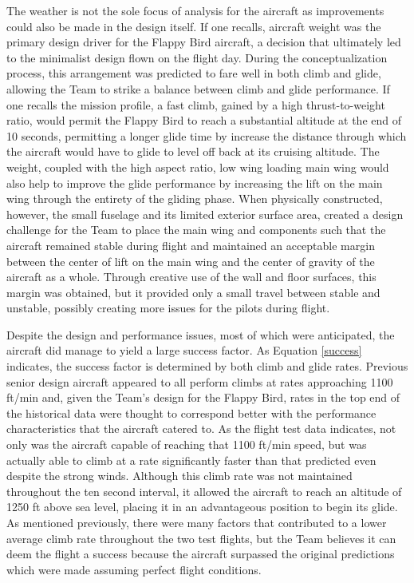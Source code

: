 \documentclass[titlepage]{article}
\begin{document}
The weather is not the sole focus of analysis for the aircraft as improvements could also be made in the design itself. If one recalls, aircraft weight was the primary design driver for the Flappy Bird aircraft, a decision that ultimately led to the minimalist design flown on the flight day. During the conceptualization process, this arrangement was predicted to fare well in both climb and glide, allowing the Team to strike a balance between climb and glide performance. If one recalls the mission profile, a fast climb, gained by a high thrust-to-weight ratio, would permit the Flappy Bird to reach a substantial altitude at the end of 10 seconds, permitting a longer glide time by increase the distance through which the aircraft would have to glide to level off back at its cruising altitude. The weight, coupled with the high aspect ratio, low wing loading main wing would also help to improve the glide performance by increasing the lift on the main wing through the entirety of the gliding phase. When physically constructed, however, the small fuselage and its limited exterior surface area, created a design challenge for the Team to place the main wing and components such that the aircraft remained stable during flight and maintained an acceptable margin between the center of lift on the main wing and the center of gravity of the aircraft as a whole. Through creative use of the wall and floor surfaces, this margin was obtained, but it provided only a small travel between stable and unstable, possibly creating more issues for the pilots during flight.

Despite the design and performance issues, most of which were anticipated, the aircraft did manage to yield a large success factor. As Equation \ref{success} indicates, the success factor is determined by both climb and glide rates. Previous senior design aircraft appeared to all perform climbs at rates approaching 1100 ft/min and, given the Team's design for the Flappy Bird, rates in the top end of the historical data were thought to correspond better with the performance characteristics that the aircraft catered to. As the flight test data indicates, not only was the aircraft capable of reaching that 1100 ft/min speed, but was actually able to climb at a rate significantly faster than that predicted even despite the strong winds. Although this climb rate was not maintained throughout the ten second interval, it allowed the aircraft to reach an altitude of 1250 ft above sea level, placing it in an advantageous position to begin its glide. As mentioned previously, there were many factors that contributed to a lower average climb rate throughout the two test flights, but the Team believes it can deem the flight a success because the aircraft surpassed the original predictions which were made assuming perfect flight conditions.
\end{document}
